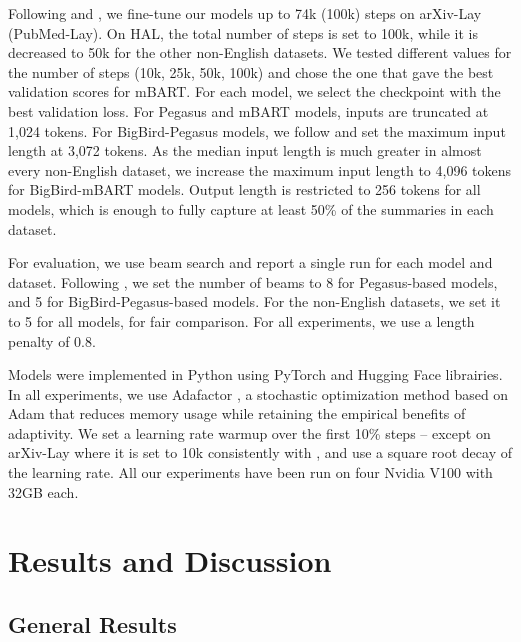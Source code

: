 Following \citet{zhang2020pegasus} and \citet{zaheer2020big}, we fine-tune our models up to 74k (100k) steps on arXiv-Lay (PubMed-Lay). On HAL, the total number of steps is set to 100k, while it is decreased to 50k for the other non-English datasets. We tested different values for the number of steps (10k, 25k, 50k, 100k) and chose the one that gave the best validation scores for mBART.
For each model, we select the checkpoint with the best validation loss. For Pegasus and mBART models, inputs are truncated at 1,024 tokens. For BigBird-Pegasus models, we follow \citet{zaheer2020big} and set the maximum input length at 3,072 tokens. As the median input length is much greater in almost every non-English dataset, we increase the maximum input length to 4,096 tokens for BigBird-mBART models. Output length is restricted to 256 tokens for all models, which is enough to fully capture at least 50\% of the summaries in each dataset.

For evaluation, we use beam search and report a single run for each model and dataset. Following \citet{zhang2020pegasus, zaheer2020big}, we set the number of beams to 8 for Pegasus-based models, and 5 for BigBird-Pegasus-based models. For the non-English datasets, we set it to 5 for all models, for fair comparison. For all experiments, we use a length penalty of 0.8. 

Models were implemented in Python using PyTorch \citep{paszke2017automatic} and Hugging Face \citep{wolf2019huggingface} librairies. In all experiments, we use Adafactor \citep{shazeer2018adafactor}, a stochastic optimization method based on Adam \citep{kingma2014adam} that reduces memory usage while retaining the empirical benefits of adaptivity. We set a learning rate warmup over the first 10\% steps -- except on arXiv-Lay where it is set to 10k consistently with \citet{zaheer2020big}, and use a square root decay of the learning rate. All our experiments have been run on four Nvidia V100 with 32GB each. 

\section{Results and Discussion}

\subsection{General Results}

